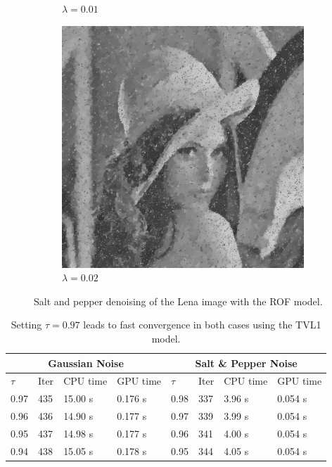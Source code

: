 \documentclass[abstracton]{scrreprt}
\begin{document}
\begin{figure}[!ht]
\begin{subfigure}[b]{0.24\textwidth}
                    \caption{$\lambda = 0.01$}
                \end{subfigure}
                \begin{subfigure}[b]{0.24\textwidth}
                    \includegraphics[width=\textwidth]{img/denoising/salt_and_pepper_noise/002lena.png}
                    \caption{$\lambda = 0.02$}
                \end{subfigure}
                \caption[Salt and pepper denoising example: ROF.]{Salt and pepper denoising of the Lena image with the ROF model.}
            \label{fig:denoising_lena_rof_sap}
            \end{figure}
            \begin{table}[!ht]
                \centering
                \begin{tabular}{| l | l | l | l | l | l | l | l |}
                    \hline
                    \multicolumn{4}{|c|}{Gaussian Noise} & \multicolumn{4}{|c|}{Salt \& Pepper Noise} \\ \hline\hline
                    $\tau$ & Iter & CPU time & GPU time & $\tau$ & Iter & CPU time & GPU time \\ \hline
                    0.97 & 435 & 15.00 s & 0.176 s & 0.98 & 337 & 3.96 s & 0.054 s \\ \hline
                    0.96 & 436 & 14.90 s & 0.177 s & 0.97 & 339 & 3.99 s & 0.054 s \\ \hline
                    0.95 & 437 & 14.98 s & 0.177 s & 0.96 & 341 & 4.00 s & 0.054 s \\ \hline
                    0.94 & 438 & 15.05 s & 0.178 s & 0.95 & 344 & 4.05 s & 0.054 s \\ \hline
                \end{tabular}
                \caption[Best estimate of $\tau$ for the TVL1 model for denoising.]{Setting $\tau = 0.97$ leads to fast convergence in both cases using the TVL1 model.}
                \label{tab:estimation_of_tau_denoising}
            \end{table}
\end{document}
